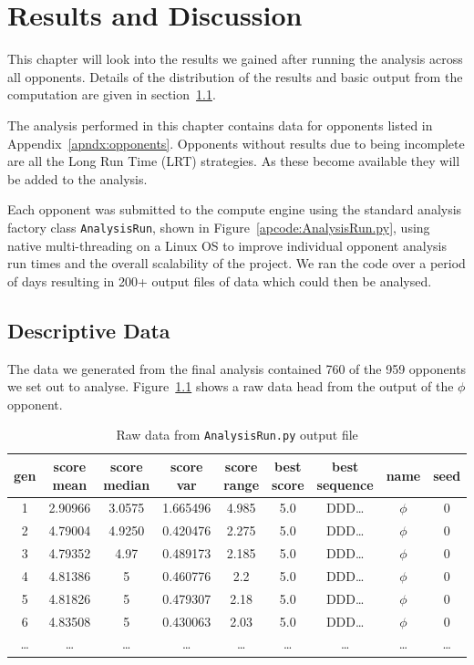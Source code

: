 \chapter{Results and Discussion}\label{ch:results}
This chapter will look into the results we gained after running the analysis across all opponents.
Details of the distribution of the results and basic output from the computation are given in section~\ref{sec:descriptive_data}.

The analysis performed in this chapter contains data for opponents listed in Appendix~\ref{apndx:opponents}.
Opponents without results due to being incomplete are all the Long Run Time (LRT) strategies.
As these become available they will be added to the analysis.

Each opponent was submitted to the compute engine using the standard analysis factory class \texttt{AnalysisRun}, shown in Figure~\ref{apcode:AnalysisRun.py}, using native multi-threading on a Linux OS to improve individual opponent analysis run times and the overall scalability of the project.
We ran the code over a period of days resulting in 200+ output files of data which could then be analysed.

\section{Descriptive Data}\label{sec:descriptive_data}
The data we generated from the final analysis contained 760 of the 959 opponents we set out to analyse.
Figure~\ref{table:data_dump} shows a raw data head from the output of the $\phi$ opponent.

\begin{table}[ht]
    \centering
    \begin{tabular}{ccccccccc}
        \toprule
        gen & score mean & score median & score var & score range & best score & best sequence &  name & seed \\
        \midrule
        1 & 2.90966 & 3.0575 & 1.665496 & 4.985 & 5.0 & DDD\ldots & $\phi$ & 0 \\
        2 & 4.79004 & 4.9250 & 0.420476 & 2.275 & 5.0 & DDD\ldots & $\phi$ & 0\\
        3 & 4.79352 & 4.97 & 0.489173 & 2.185 & 5.0 & DDD\ldots & $\phi$ & 0\\
        4 & 4.81386 & 5 & 0.460776 & 2.2 & 5.0 & DDD\ldots & $\phi$ & 0\\
        5 & 4.81826 & 5 & 0.479307 & 2.18 & 5.0 & DDD\ldots & $\phi$ & 0\\
        6 & 4.83508 & 5 & 0.430063 & 2.03 & 5.0 & DDD\ldots & $\phi$ & 0\\
        \ldots & \ldots & \ldots & \ldots & \ldots & \ldots & \ldots & \ldots & \ldots\\        
        \bottomrule
    \end{tabular}
    \caption{Raw data from \texttt{AnalysisRun.py} output file}\label{table:data_dump}
\end{table}

